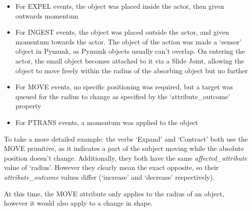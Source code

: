 \documentclass[dissertation.tex]{subfiles}
\begin{document}
    \begin{itemize}
        \item For EXPEL events, the object was placed inside the actor, then given outwards momentum
        \item For INGEST events, the object was placed outside the actor, and given momentum towards the actor. The object of the action was made a `sensor' object in Pymunk, as Pymunk objects usually can't overlap. On entering the actor, the small object becomes attached to it via a Slide Joint, allowing the object to move freely within the radius of the absorbing object but no further
        \item For MOVE events, no specific positioning was required, but a target was queued for the radius to change as specified by the `attribute\_outcome' property
        \item For PTRANS events, a momentum was applied to the object
    \end{itemize}

    To take a more detailed example: the verbs `Expand' and `Contract' both use the MOVE primitive, as it indicates a part of the subject moving while the absolute position doesn't change. Additionally, they both have the same \emph{affected\_attribute} value of `radius'. However they clearly mean the exact opposite, so their \emph{attribute\_outcome} values differ (`increase' and `decrease' respectively).

    At this time, the MOVE attribute only applies to the radius of an object, however it would also apply to a change in shape.

\end{document}
